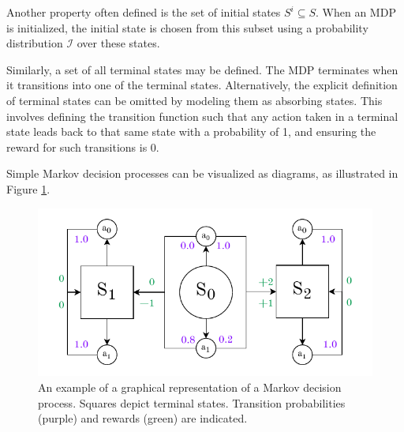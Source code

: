 \documentclass[
  digital,     %
  oneside,     %
  nosansbold,  %
  nocolorbold, %
  lof,         %
  lot,         %
]{fithesis4}
\begin{document}
Another property often defined is the set of initial states $S^i \subseteq S$. When an MDP is initialized, the initial state is chosen from this subset using a probability distribution $\mathcal{I}$ over these states.

Similarly, a set of all terminal states may be defined. The MDP terminates when it transitions into one of the terminal states. Alternatively, the explicit definition of terminal states can be omitted by modeling them as absorbing states. This involves defining the transition function such that any action taken in a terminal state leads back to that same state with a probability of 1, and ensuring the reward for such transitions is 0.

Simple Markov decision processes can be visualized as diagrams, as illustrated in Figure \ref{fig:mdp}.

\begin{figure}
    \centering
    \includegraphics[width=1\linewidth]{diagrams/mdp.pdf}
    \caption{An example of a graphical representation of a Markov decision process. Squares depict terminal states. Transition probabilities (purple) and rewards (green) are indicated.}
    \label{fig:mdp}
\end{figure}
\end{document}
